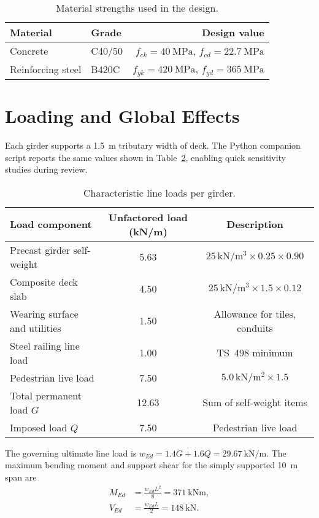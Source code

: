 \documentclass[12pt,a4paper]{article}
\begin{document}
\begin{table}[h]
\centering
\begin{tabular}{llr}
\toprule
Material & Grade & Design value \\
\midrule
Concrete & C40/50 & $f_{ck}=\SI{40}{\mega\pascal}$, $f_{cd}=\SI{22.7}{\mega\pascal}$ \\
Reinforcing steel & B420C & $f_{yk}=\SI{420}{\mega\pascal}$, $f_{yd}=\SI{365}{\mega\pascal}$ \\
\bottomrule
\end{tabular}
\caption{Material strengths used in the design.}
\label{tab:materials}
\end{table}

\section{Loading and Global Effects}
Each girder supports a \SI{1.5}{\meter} tributary width of deck. The Python companion script reports the same values shown in Table~\ref{tab:loads}, enabling quick sensitivity studies during review.

\begin{table}[h]
\centering
\begin{tabular}{lcc}
\toprule
Load component & Unfactored load (kN/m) & Description \\
\midrule
Precast girder self-weight & 5.63 & $25\,\mathrm{kN/m^3}\times0.25\times0.90$ \\
Composite deck slab & 4.50 & $25\,\mathrm{kN/m^3}\times1.5\times0.12$ \\
Wearing surface and utilities & 1.50 & Allowance for tiles, conduits \\
Steel railing line load & 1.00 & TS~498 minimum \\
Pedestrian live load & 7.50 & $5.0\,\mathrm{kN/m^2}\times1.5$ \\
\midrule
Total permanent load $G$ & 12.63 & Sum of self-weight items \\
Imposed load $Q$ & 7.50 & Pedestrian live load \\
\bottomrule
\end{tabular}
\caption{Characteristic line loads per girder.}
\label{tab:loads}
\end{table}

The governing ultimate line load is $w_{Ed} = 1.4G + 1.6Q = \SI{29.67}{\kilo\newton\per\meter}$. The maximum bending moment and support shear for the simply supported \SI{10}{\meter} span are
\begin{align*}
M_{Ed} &= \frac{w_{Ed}L^2}{8} = \SI{371}{\kilo\newton\meter}, \\
V_{Ed} &= \frac{w_{Ed}L}{2} = \SI{148}{\kilo\newton}.
\end{align*}
\end{document}
